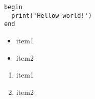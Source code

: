         \begin{lstlisting}[caption={Название листинга}]
begin
  print('Hellow world!')
end
        \end{lstlisting}

        \begin{itemize}
          \item item1
          \item item2
        \end{itemize}

        \begin{enumerate}
          \item item1
          \item item2
        \end{enumerate}
